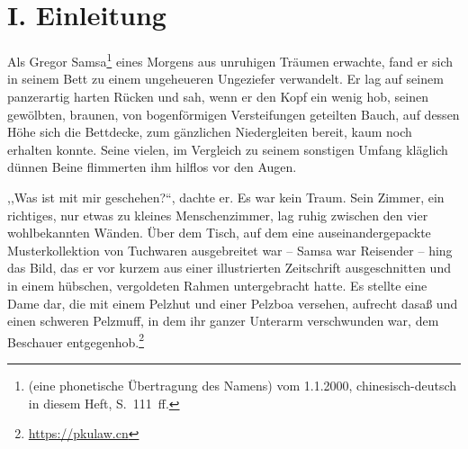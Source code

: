 \documentclass[prepress]{zchinr}
\begin{document}

\printtitle

\section{I. Einleitung}

Als Gregor Samsa\footnote{ (eine phonetische Übertragung des Namens) vom 1.1.2000, chinesisch-deutsch in diesem Heft, S.~111~ff.} eines Morgens aus unruhigen Träumen erwachte, fand er sich in seinem Bett zu einem ungeheueren Ungeziefer verwandelt. Er lag auf seinem panzerartig harten Rücken und sah, wenn er den Kopf ein wenig hob, seinen gewölbten, braunen, von bogenförmigen Versteifungen geteilten Bauch, auf dessen Höhe sich die Bettdecke, zum gänzlichen Niedergleiten bereit, kaum noch erhalten konnte. Seine vielen, im Vergleich zu seinem sonstigen Umfang kläglich dünnen Beine flimmerten ihm hilflos vor den Augen.

,,Was ist mit mir geschehen?{}``, dachte er. Es war kein Traum. Sein Zimmer, ein richtiges, nur etwas zu kleines Menschenzimmer, lag ruhig zwischen den vier wohlbekannten Wänden. Über dem Tisch, auf dem eine auseinandergepackte Musterkollektion von Tuchwaren ausgebreitet war -- Samsa war Reisender -- hing das Bild, das er vor kurzem aus einer illustrierten Zeitschrift ausgeschnitten und in einem hübschen, vergoldeten Rahmen untergebracht hatte. Es stellte eine Dame dar, die mit einem Pelzhut und einer Pelzboa versehen, aufrecht dasaß und einen schweren Pelzmuff, in dem ihr ganzer Unterarm verschwunden war, dem Beschauer entgegenhob.\footnote{\url{https://pkulaw.cn}}
\end{document}
